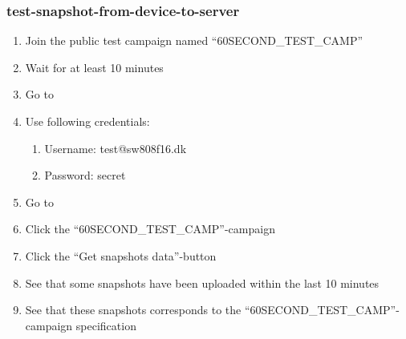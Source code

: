 \subsubsection{test-snapshot-from-device-to-server}
\begin{enumerate}
    \item Join the public test campaign named ``60SECOND\_TEST\_CAMP''
    \item Wait for at least 10 minutes
    \item Go to 
    \item Use following credentials:
        \begin{enumerate}
            \item Username: test@sw808f16.dk
            \item Password: secret
        \end{enumerate}
    \item Go to 
    \item Click the ``60SECOND\_TEST\_CAMP''-campaign
    \item Click the ``Get snapshots data''-button
    \item See that some snapshots have been uploaded within the last 10 minutes
    \item See that these snapshots corresponds to the ``60SECOND\_TEST\_CAMP''-campaign specification
\end{enumerate}
